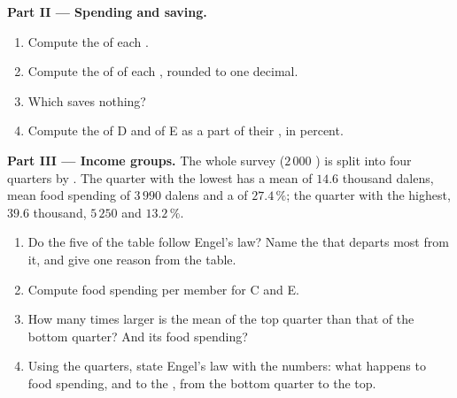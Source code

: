 \begin{problem}
\medskip
\noindent\textbf{Part II --- Spending and saving.}
\begin{enumerate}[resume]
  \item Compute the  of each .
  \item Compute the  of  of each , rounded to one decimal.
  \item Which  saves nothing?
  \item Compute the  of D and of E as a part of their , in percent.
\end{enumerate}

\medskip
\noindent\textbf{Part III --- Income groups.} The whole survey ($2\,000$ ) is split into
four quarters by . The quarter with the lowest  has a mean  of $14.6$ thousand dalens, mean food spending of $3\,990$ dalens and a  of
$27.4\,\%$; the quarter with the highest, $39.6$ thousand, $5\,250$ and $13.2\,\%$.
\begin{enumerate}[resume]
  \item Do the five  of the table follow Engel's law? Name the  that departs
        most from it, and give one reason from the table.
  \item Compute food spending per member for  C and E.
  \item How many times larger is the mean  of the top quarter than that of the
        bottom quarter? And its food spending?
  \item Using the quarters, state Engel's law with the numbers: what happens to food spending, and
        to the , from the bottom quarter to the top.
\end{enumerate}
\end{problem}
